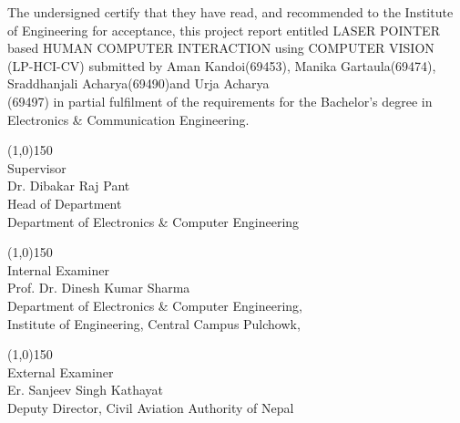 \vspace{0.5cm}
        The undersigned certify that they have read, and recommended to the Institute of Engineering for acceptance, this project report entitled LASER POINTER based HUMAN­ COMPUTER INTERACTION using COMPUTER VISION (LP-­HCI-­CV) submitted by Aman Kandoi(69453), Manika Gartaula(69474), Sraddhanjali Acharya(69490)and Urja Acharya \\(69497) in partial fulfilment of the requirements for the Bachelor's degree in Electronics \& Communication Engineering.
        
\vspace{1cm}
\noindent
\begin{minipage}[t]{0.45\textwidth}
\line(1,0){150}\\
Supervisor\\
Dr. Dibakar Raj Pant\\
Head of Department\\
Department of Electronics \& Computer Engineering\\
\end{minipage}

\vspace{1cm}
\noindent
\begin{minipage}[t]{0.45\textwidth}
\line(1,0){150}\\
Internal Examiner\\
Prof. Dr. Dinesh Kumar Sharma\\
Department of Electronics \& Computer Engineering,\\
Institute of Engineering, Central Campus Pulchowk,\\
\end{minipage}\hfill
\begin{minipage}[t]{0.45\textwidth}
\line(1,0){150}\\
External Examiner\\
Er. Sanjeev Singh Kathayat\\
Deputy Director, 
Civil Aviation Authority of Nepal
\end{minipage}

